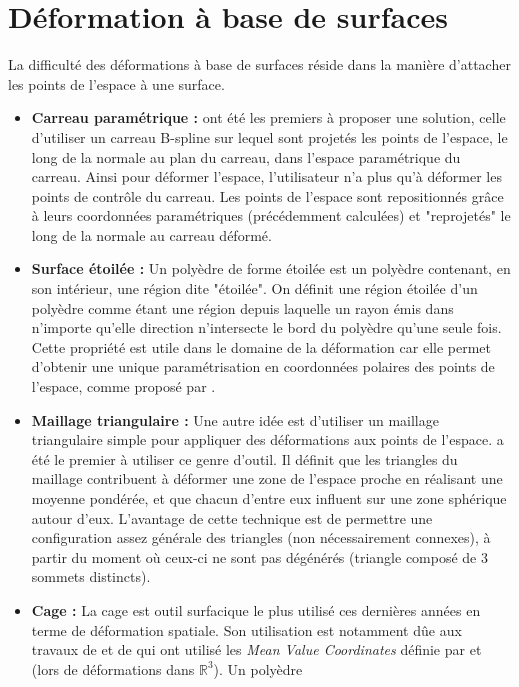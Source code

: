 \section{Déformation à base de surfaces}
La difficulté des déformations à base de surfaces réside dans la
manière d'attacher les points de l'espace à une surface.

\begin{itemize}
\item{\textbf{Carreau paramétrique :}} \cite{JLQ96} ont été les
  premiers à proposer une solution, celle d'utiliser un carreau
  B-spline sur lequel sont projetés les points de l'espace, le long de
  la normale au plan du carreau, dans l'espace paramétrique du
  carreau. Ainsi pour déformer l'espace, l'utilisateur n'a plus qu'à
  déformer les points de contrôle du carreau. Les points de l'espace
  sont repositionnés grâce à leurs coordonnées paramétriques
  (précédemment calculées) et "reprojetés" le long de la normale au
  carreau déformé.
\item{\textbf{Surface étoilée :}} Un polyèdre de forme étoilée est un
  polyèdre contenant, en son intérieur, une région dite "étoilée". On
  définit une région étoilée d'un polyèdre comme étant une région
  depuis laquelle un rayon émis dans n'importe qu'elle direction
  n'intersecte le bord du polyèdre qu'une seule fois. Cette propriété
  est utile dans le domaine de la déformation car elle permet
  d'obtenir une unique paramétrisation en coordonnées polaires des
  points de l'espace, comme proposé par \cite{JL00}.
\item{\textbf{Maillage triangulaire :}} Une autre idée est d'utiliser
  un maillage triangulaire simple pour appliquer des déformations aux
  points de l'espace. \cite{KO03} a été le premier à utiliser ce genre
  d'outil. Il définit que les triangles du maillage contribuent à
  déformer une zone de l'espace proche en réalisant une moyenne
  pondérée, et que chacun d'entre eux influent sur une zone sphérique
  autour d'eux. L'avantage de cette technique est de permettre une
  configuration assez générale des triangles (non nécessairement
  connexes), à partir du moment où ceux-ci ne sont pas dégénérés
  (triangle composé de 3 sommets distincts).
\item{\textbf{Cage :}} La cage est outil surfacique le plus utilisé ces dernières
  années en terme de déformation spatiale. Son utilisation est
  notamment dûe aux travaux de \cite{JSW05} et de \cite{HF06} qui ont utilisé les
  \textit{Mean Value Coordinates} définie par \cite{Flo03} et
  \cite{FKR05} (lors de déformations dans $\mathbb{R}^3$). Un polyèdre

\end{itemize}
